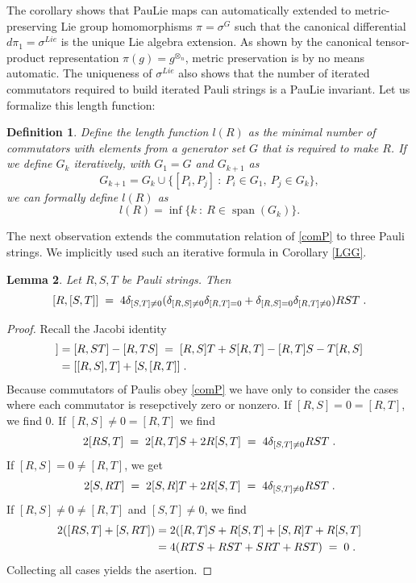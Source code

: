 \documentclass[12pt, a4-paper]{amsart}
\numberwithin{equation}{section}
\newcommand{\lel}{\pl = \pl}
\newcommand{\ten}{\otimes}
\newcommand{\pl}{\hspace{.1cm}}
\newcommand{\si}{\sigma}
\newtheorem{lemma}{Lemma}[section]
\newtheorem{defi}[lemma]{Definition}
\begin{document}
The corollary shows that PauLie maps can automatically extended to metric-preserving Lie group homomorphisms $\pi=\si^G$ such that the canonical  differential $d\pi_{1}=\si^{Lie}$ is the unique Lie algebra extension. As shown by the canonical tensor-product representation $\pi(g)=g^{\ten_n}$, metric preservation is by no means automatic. The uniqueness of $\si^{Lie}$ also shows that the number of iterated commutators required to build  iterated Pauli strings is a PauLie invariant. Let us formalize this length function:
\begin{defi}\label{def:length_function}
    Define the length function $l(R)$ as the minimal number of commutators with elements from a generator set $G$ that is required to make $R$. If we define $G_k$ iteratively, with $G_1 = G$ and $G_{k+1}$ as 
    \begin{equation}
        G_{k+1} = G_k \cup \{[P_i, P_j] ~:~ P_i \in G_1,~ P_j \in G_k \},
    \end{equation}
    we can formally define $l(R)$ as
    \begin{equation}
        l(R)=\inf \big\{ k ~:~ R \in \operatorname{span}(G_k)\}.
    \end{equation}
\end{defi}
The next observation extends the commutation relation of \eqref{comP} to three Pauli strings. We implicitly used such an iterative formula in Corollary \ref{LGG}. 
\begin{lemma}\label{lem:paulis_closed} Let $R,S,T$ be Pauli strings. Then 
 \[ [R,[S,T]] \lel 4 \delta_{[S,T]\neq 0}(\delta_{[R,S]\neq 0}\delta_{[R,T]=0}+
 \delta_{[R,S]= 0}\delta_{[R,T]\neq 0}) RST \pl .  
  \]
\end{lemma} 
\begin{proof} Recall the Jacobi identity
 \begin{align*}
  [R,[S,T]] &= [R,ST]-[R,TS] \lel [R,S]T+S[R,T]-[R,T]S-T[R,S] \\
  &= 
   [[R,S],T]+[S,[R,T]] \pl .
  \end{align*}
Because commutators of Paulis obey \eqref{comP} we have only to consider the cases where each commutator is resepctively zero or nonzero. If $[R,S]=0=[R,T]$, we find $0$. If $[R,S]\neq 0=[R,T]$ we find
 \[ 2[RS,T] \lel 2[R,T]S+2R[S,T] \lel 4\delta_{[S,T]\neq 0} RST \pl .\] 
If $[R,S]=0\neq [R,T]$, we get
 \[ 2[S,RT] \lel 2[S,R]T+2R[S,T] \lel  4 \delta_{[S,T]\neq 0} RST \pl .\] 
If $[R,S]\neq 0\neq [R,T]$ and $[S,T]\neq 0$, we find 
  \begin{align*}
   2([RS,T]+ [S,RT])&= 2([R,T]S+R[S,T]+[S,R]T+R[S,T] \\
   &=  4 (RTS+RST+SRT+RST) \lel 0 \pl .
   \end{align*}
Collecting all cases yields the asertion.   
\end{proof}
\end{document}
